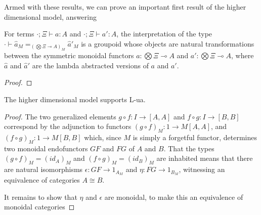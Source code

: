 Armed with these results, we can prove an important first result of the higher dimensional model, answering 
  \begin{lemm}For terms $\cdot; \Xi \vdash a : A$ and $\cdot; \Xi \vdash a' : A$, the interpretation of the type $\cdot \vdash \hat a_M =_{(\bigotimes \Xi \multimap A)_M}  \hat a'_M$ is a groupoid whose objects are natural transformations between the symmetric monoidal functors $a : \bigotimes \Xi \multimap A$ and $a' : \bigotimes \Xi \multimap A$, where $\hat a$ and $\hat a'$ are the lambda abstracted versions of $a$ and $a'$.
    \begin{proof}
    \end{proof}
  \end{lemm}
  \begin{thm}
    The higher dimensional model supports L-ua.
    \begin{proof}
      The two generalized elements $g \circ f : I \to [A, A]$ and $f \circ g : I \to [B, B]$ correspond by the adjunction to functors $(g \circ f)_M : 1 \to M[A, A]$, and $(f \circ g)_M : 1 \to M[B, B]$ which, since $M$ is simply a forgetful functor, determines two monoidal endofunctors $GF$ and $FG$ of $A$ and $B$. That the types $(g \circ f)_M = (id_A)_M$ and $(f \circ g)_M = (id_B)_M$ are inhabited means that there are natural isomorphisms $\epsilon: GF \to 1_{A_M}$ and $\eta: FG \to 1_{B_M}$, witnessing an equivalence of categories $A \cong B$.

      It remains to show that $\eta$ and $\epsilon$ are monoidal, to make this an equivalence of monoidal categories
    \end{proof}
  \end{thm}
